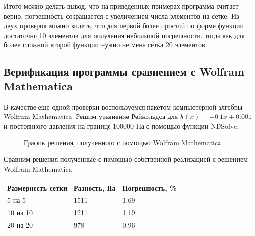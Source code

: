 \documentclass[a4paper,14pt]{extarticle}
\begin{document}
Итого можно делать вывод, что на приведенных примерах программа считает верно, погрешность сокращается с увеличением числа элементов на сетке. Из двух проверок можно видеть, что для первой более простой по форме функции достаточно 10 элементов для получения небольшой погрешности, тогда как для более сложной второй функции нужно не мена сетка 20 элементов.



\subsection{Верификация программы сравнением с Wolfram Mathematica}

В качестве еще одной проверки воспользуемся пакетом компьютерной алгебры Wolfram Mathematica.
Решим уравнение Рейнольдса для $h(x) = -0.1x + 0.001$ и постоянного давления на границе $100000$ Па с помощью функции NDSolve.

\begin{figure}[!htbp]
	\caption{График решения, полученного с помощью Wolfram Mathematica}
	\label{w_sol}
\end{figure}

Сравним решения полученные с помощью собственной реализацией с решением Wolfram Mathematica.

\begin{table}[!htbp]
	\begin{tabular}{|l|l|l|}
		\hline
		\multicolumn{1}{|c|}{Размерность сетки} & \multicolumn{1}{c|}{Разность, Па} & Погрешность, \% \\ \hline
		5 на 5                                  & 1511	                              & 1.69            \\ \hline
		10 на 10                                & 1211                              & 1.19            \\ \hline
		20 на 20                                & 978                              & 0.96            \\ \hline
	\end{tabular}
\end{table}
\end{document}
